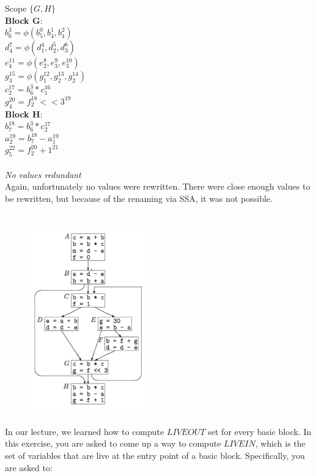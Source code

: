 \documentclass[11pt]{article}
\begin{document}
\begin{enumerate}
\begin{Answer}
		      Scope $\{G, H\}$ \\
		      \textbf{Block G}: \\
		      $b_6^3 = \phi(b_5^0, b_4^1, b_4^2)$ \\
		      $d_4^7 = \phi(d_1^4, d_2^5, d_3^6)$ \\
		      $e_4^{11} = \phi(e_2^8, e_3^9, e_3^{10})$ \\
		      $g_3^{15} = \phi(g_1^{12}, g_2^{13}, g_2^{14})$ \\
		      $c_2^{17} = b_6^3 * c_1^{16}$ \\
		      $g_4^{20} = f_2^{18} << 3^{19}$ \\
		      \textbf{Block H}: \\
		      $b_7^{18} = b_6^3 * c_2^{17}$ \\
		      $a_2^{19} = b_7^{18} - a_1^{19}$ \\
		      $g_5^{22} = f_2^{20} + 1^{21}$ \\
		      \\
		      \textit{No values redundant} \\

		      Again, unfortunately no values were rewritten. There were close enough values to be rewritten, but because of the renaming via SSA, it was not possible.
	      \end{Answer}
\end{enumerate}

\newpage
\section{}
\begin{figure}[H]
	\centerline{\includegraphics[width=2in]{figures/hw1_cfg2.png}}
\end{figure}
In our lecture, we learned how to compute $LIVEOUT$ set for every basic block. In this exercise, you are asked to come up a way to compute $LIVEIN$, which is the set of variables that are live at the entry point of a basic block. Specifically, you are asked to:
\end{document}
